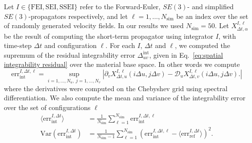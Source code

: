 \documentclass[withindex,glossary,techreport]{cam-thesis}
\begin{document}
\begin{appendices}
Let $I \in \{ \text{FEI}, \text{SEI}, \text{SSEI} \}$ refer to the Forward-Euler, $SE(3)$- and simplified $SE(3)$-propagators respectively, and let $\ell = 1, \dots, N_\text{sim}$ be an index over the set of randomly generated velocity fields. In our results we used $N_\text{sim} = 50$. Let $X_{\Delta t, \alpha}^{I, \ell}$ be the result of computing the short-term propagator using integrator $I$, with time-step $\Delta t$ and configuration $\ell$. For each $I$, $\Delta t$ and $\ell$, we computed the supremum of the residual integrability error $\Delta^\text{int}_{u v}$, given in Eq.~\ref{eq:spatial integrability residual} over the material base space. In other words we compute
\begin{equation}
	\text{err}_\text{int}^{I, \Delta t, \ell} = \sup_{ i = 1,\dots,N_u,\ j = 1,\dots, N_v } \left| \partial_v X_{\Delta t, u}^{I, \ell} (i \Delta u, j \Delta v) - \mathcal{D}_u X_{\Delta t, v}^{I, \ell} (i \Delta u, j \Delta v).
 \right|
\end{equation}
where the derivatives were computed on the Chebyshev grid using spectral differentiation. We also compute the mean and variance of the integrability error over the set of configurations $\ell$
\begin{subequations}
	\begin{align}
		\langle \text{err}_\text{int}^{I, \Delta t} \rangle & = \frac{1}{N_\text{sim}} \sum_{\ell = 1}^{N_\text{sim}} \text{err}_\text{int}^{I, \Delta t, \ell} \\
		\text{Var}( \text{err}_\text{int}^{I, \Delta t}) & = \frac{1}{N_\text{sim}-1} \sum_{\ell = 1}^{N_\text{sim}} ( \text{err}_\text{int}^{I, \Delta t, \ell} - \langle \text{err}_\text{ref}^{I, \Delta t} \rangle)^2.
	\end{align}
\end{subequations}

\end{appendices}
\end{document}
